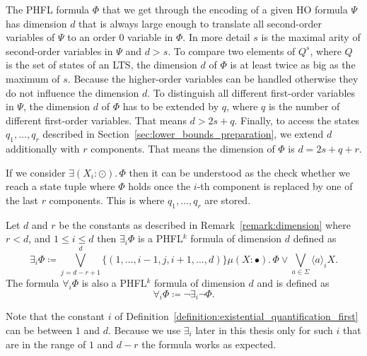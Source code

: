 \begin{remark}
\label{remark:dimension}
    The PHFL formula $\Phi$ that we get through the encoding of a given HO formula $\Psi$ has dimension
    $d$ that is always large enough to translate all second-order variables of $\Psi$ to an order $0$ variable in
    $\Phi$. In more detail $s$ is the maximal arity of second-order variables in $\Psi$ and $d > s$. To compare
    two  elements of $Q^{s}$, where $Q$ is the set of states of an LTS, the dimension $d$ of 
    $\Phi$ is at least twice as big as the maximum of $s$. Because the higher-order variables can be handled otherwise they do not influence the dimension $d$. To distinguish all
    different first-order variables in $\Psi$, the dimension $d$ of $\Phi$ has to be extended by $q$, where $q$ is the number of different first-order variables. That means $d > 2s + q$. Finally, to access the 
    states $q_1, \dots, q_r$ described in Section~\ref{sec:lower_bounds_preparation}, 
    we extend $d$ additionally with $r$ components. That means the dimension of $\Phi$ is $d = 2s + q + r$.
\end{remark}

If we consider $\exists (X_i \colon \odot).\,\Phi$ then it can be understood as the check whether we reach a state tuple where $
\Phi$ holds once the $i$-th component is replaced by one of the last $r$ components. This is where $q_1, \dots, q_r$ are stored.

\begin{definition}
\label{definition:existential_quantification_first}
    Let $d$ and $r$ be the constants as described in Remark~\ref{remark:dimension} where $r < d$, and $1 \leq i \leq d$ then $\exists_i \Phi$ is a PHFL$^k$ formula of dimension $d$ defined as
    \[\exists_i \Phi \coloneqq \bigvee^{d}_{j=d-r+1} \{(1, \dots, i-1, j, i + 1, \dots, d)\} \mu (X
    \colon \bullet).\,\Phi \vee \bigvee_{a \in \Sigma} \langle a \rangle_{i} X.\]
    The formula $\forall_i \Phi$ is also a PHFL$^k$ formula of dimension $d$ and is defined as
    \[\forall_i \Phi \coloneqq \neg \exists_i \neg \Phi.\]
\end{definition}

Note that the constant $i$ of Definition~\ref{definition:existential_quantification_first} can be between $1$ and $d$. Because we use $\exists_i$ later in this thesis only for such $i$ that are in the range of $1$ and $d - r$ the formula works as expected.

